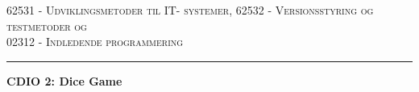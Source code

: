 \begin{titlepage}
\begin{center}
\textsc{62531 - Udviklingsmetoder til IT- systemer, 62532 - Versionsstyring og testmetoder og\\02312 - Indledende programmering}\\[0.5cm]
\hrule
\vspace{0.3cm}
{\huge\bfseries CDIO 2: Dice Game 
\\[0.4cm]} %
\begin{figure}[H] 
  \begin{subfigure}[b]{0.33\linewidth}
    \centering
  \end{subfigure}%
  \begin{subfigure}[b]{0.33\linewidth}
    \centering

\end{subfigure}
\end{figure}
\end{center}
\end{titlepage}
